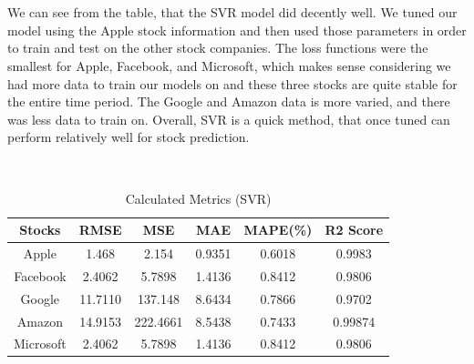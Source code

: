\usepackage{fancyhdr}\documentclass[conference]{IEEEtran}
\begin{document}
\\
\\
We can see from the table, that the SVR model did decently well. We tuned our model using the Apple stock information and then used those parameters in order to train and test on the other stock companies. The loss functions were the smallest for Apple, Facebook, and Microsoft, which makes sense considering we had more data to train our models on and these three stocks are quite stable for the entire time period. The Google and Amazon data is more varied, and there was less data to train on. Overall, SVR is a quick method, that once tuned can perform relatively well for stock prediction. 

\\


\begin{table}[h]
\renewcommand{\arraystretch}{1.3}
\caption{Calculated Metrics (SVR)}
\label{tab:example}
\centering


\begin{tabular}{|c|c|c|c|c|c|}
    \hline
    Stocks  &  RMSE & MSE & MAE & MAPE(\%) & R2 Score\\
    \hline
    \hline

    Apple   &   1.468 & 2.154 & 0.9351 & 0.6018 & 0.9983\\
    \hline

    Facebook   &   2.4062 & 5.7898 & 1.4136 & 0.8412 & 0.9806\\
    \hline

    Google   &  11.7110  & 137.148 & 8.6434  & 0.7866  & 0.9702\\
    \hline
  
    Amazon   &  14.9153  & 222.4661  & 8.5438 & 0.7433 & 0.99874\\
    \hline
    
    Microsoft   &  2.4062  & 5.7898 & 1.4136 & 0.8412 & 0.9806\\
    \hline
\end{tabular}

\end{table}
\end{document}
